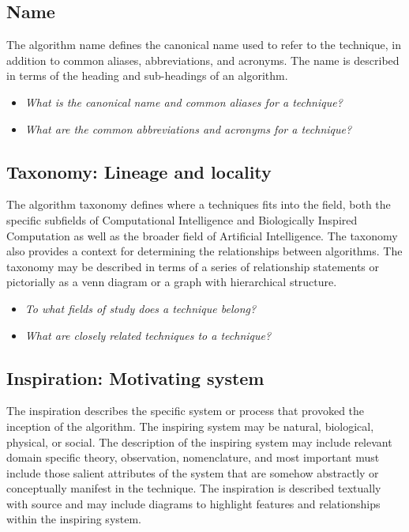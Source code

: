 \documentclass[a4paper, 11pt]{article}
\begin{document}
\subsection{Name}
The algorithm name defines the canonical name used to refer to the technique, in addition to common aliases, abbreviations, and acronyms. The name is described in terms of the heading and sub-headings of an algorithm.

\begin{itemize}
	\item \emph{What is the canonical name and common aliases for a technique?}
	\item \emph{What are the common abbreviations and acronyms for a technique?}
\end{itemize}

\subsection{Taxonomy: Lineage and locality}
The algorithm taxonomy defines where a techniques fits into the field, both the specific subfields of Computational Intelligence and Biologically Inspired Computation as well as the broader field of Artificial Intelligence. The taxonomy also provides a context for determining the relationships between algorithms. The taxonomy may be described in terms of a series of relationship statements or pictorially as a venn diagram or a graph with hierarchical structure.

\begin{itemize}
	\item \emph{To what fields of study does a technique belong?}
	\item \emph{What are closely related techniques to a technique?}
\end{itemize}

\subsection{Inspiration: Motivating system}
The inspiration describes the specific system or process that provoked the inception of the algorithm. The inspiring system may be natural, biological, physical, or social. The description of the inspiring system may include relevant domain specific theory, observation, nomenclature, and most important must include those salient attributes of the system that are somehow abstractly or conceptually manifest in the technique. The inspiration is described textually with source and may include diagrams to highlight features and relationships within the inspiring system.
\end{document}
